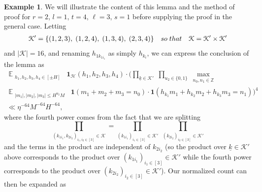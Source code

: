 \documentclass[11pt]{amsart}
\theoremstyle{definition}
\newtheorem{example}[lemma]{Example} %
\DeclareMathOperator*{\E}{\mathbb{E}}
\newcommand{\Z}{{\mathbb Z}}
\newcommand{\CH}{{\mathcal H}}
\newcommand{\CK}{{\mathcal K}}
\newcommand{\uk}{{\underline{k}}}
\begin{document}
\begin{example}
We will illustrate the content of this lemma and the method of proof for $r=2$, $l=1$, $t=4$, $\ell =3$, $s=1$ before supplying the proof in the general case. Letting
\begin{align*}
    \CK' = \{(1,2,3),\; (1,2,4),\; (1,3,4),\; (2,3,4)\}\quad \textrm{so\; that}\quad \CK = \CK' \times\CK' 
\end{align*}
and $|\CK|=16$, and renaming $h_{1k_{1i_1}}$ as simply $h_{k_i}$, we can express the conclusion of the lemma as
    \begin{multline*}
        \E_{\substack{h_1, h_2, h_3, h_4\in[\pm H]}}\; \mathbf{1}_{\CH}(h_1, h_2, h_3, h_4)\cdot \big(\prod_{\uk\in\CK'}\; \prod_{u_{2}\in\{0,1\}} \max_{\substack{n_{0}, n_{1}\in\Z}}\\
        \E_{\substack{|m_1|, |m_2|, |m_3|\leq H^{u_{2}} M}}\; \mathbf{1}(m_1 + m_2 + m_3 = n_0)\cdot \mathbf{1}(h_{k_1}m_1 + h_{k_2}m_2 + h_{k_3}m_3 = n_1)\big)^4\\
        \ll\eta^{-64}  M^{-64} H^{-64},
    \end{multline*}
    where the fourth power comes from the fact that we are splitting $$\prod\limits_{(k_{1i_1}, k_{2i_2})_{i_1,i_2\in[3]}\in\CK} = \prod\limits_{(k_{1i_1})_{i_1\in[3]}\in\CK'}\;\prod\limits_{(k_{2i_2})_{i_2\in[3]}\in\CK'}$$ and the terms in the product are independent of $k_{2i_2}$ (so the product over $\uk\in\CK'$ above corresponds to the product over $(k_{1i_1})_{i_1\in[3]}\in\CK'$ while the fourth power corresponds to the product over $(k_{2i_2})_{i_2\in[3]}\in\CK'$).
    Our normalized count can then be expanded as


\end{example}
\end{document}
